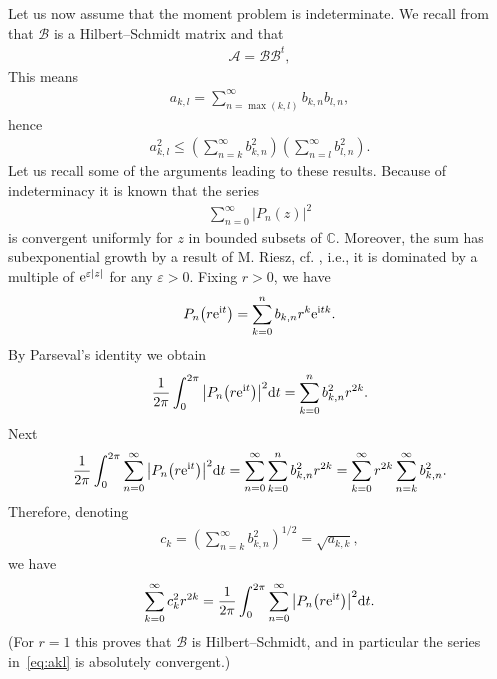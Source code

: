 Let us now assume that the moment problem is indeterminate. We recall from \cite[Proposition~4.2]{B:S1} that $\mathcal B$ is a Hilbert--Schmidt matrix and that \begin{gather}\label{eq:A=BBt}
\mathcal{A}=\mathcal B\mathcal B^t,
\end{gather}
 This means
\begin{gather}\label{eq:akl}
a_{k,l}=\sum^\infty_{n=\max(k,l)}b_{k,n}b_{l,n},
\end{gather}
hence
\begin{gather*}
a_{k,l}^2\le \left (\sum_{n=k}^\infty b_{k,n}^2\right ) \left (\sum_{n=l}^\infty b_{l,n}^2\right ).\end{gather*}
Let us recall some of the arguments leading to these results. Because of indeterminacy it
is known that the series
\begin{gather*}
\sum_{n=0}^\infty |P_n(z)|^2
\end{gather*}
 is convergent uniformly for $z$ in bounded subsets of $\mathbb{C}$. Moreover, the sum has subexponential growth by a result of M. Riesz, cf. \cite[p. 56]{Ak}, i.e., it is dominated by a multiple of ${\rm e}^{\varepsilon |z|}$ for any $\varepsilon>0$.
Fixing $r>0$, we have
\begin{gather*}
P_n\big(r{\rm e}^{{\rm i}t}\big)=\sum_{k=0}^n b_{k,n}r^k{\rm e}^{{\rm i}tk}.
\end{gather*}
By Parseval's identity we obtain
\begin{gather*}
{1\over 2\pi}\int_0^{2\pi}\big|P_n\big(r{\rm e}^{{\rm i}t}\big)\big|^2{\rm d}t = \sum_{k=0}^n b_{k,n}^2r^{2k}.
\end{gather*}
 Next
\begin{gather*}
{1\over 2\pi}\int_0^{2\pi}\sum_{n=0}^\infty \big|P_n\big(r{\rm e}^{{\rm i}t}\big)\big|^2{\rm d}t=\sum_{n=0}^\infty\sum_{k=0}^n b_{k,n}^2r^{2k}=\sum_{k=0}^\infty r^{2k}\sum_{n=k}^\infty b_{k,n}^2.
\end{gather*}
Therefore, denoting
\begin{gather}\label{eq:c_k}
c_k=\left (\sum_{n=k}^\infty b_{k,n}^2\right )^{1/2}=\sqrt{a_{k,k}},
\end{gather}
 we have
\begin{gather*}\label{eq:r}
\sum_{k=0}^\infty c_k^2r^{2k}={1\over 2\pi}\int_0^{2\pi}\sum_{n=0}^\infty \big|P_n\big(r{\rm e}^{{\rm i}t}\big)\big|^2{\rm d}t.
\end{gather*}
(For $r=1$ this proves that $\mathcal B$ is Hilbert--Schmidt, and in particular the series in~\eqref{eq:akl} is absolutely convergent.)

